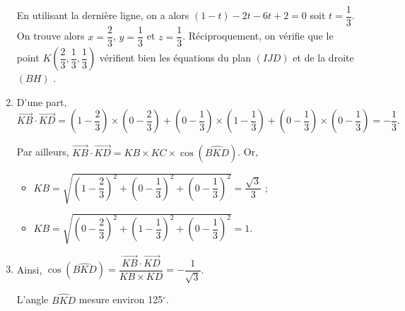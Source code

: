 \documentclass[11pt,fleqn, openany]{book} %
\begin{document}
\begin{solution}
\begin{enumerate}
    En utilisant la dernière ligne, on a alors $(1-t)-2t-6t+2=0$ soit $t=\dfrac{1}{3}$. On trouve alors $x=\dfrac{2}{3}$, $y=\dfrac{1}{3}$ et $z=\dfrac{1}{3}$. Réciproquement, on vérifie que le point $K\left(\dfrac{2}{3},\dfrac{1}{3},\dfrac{1}{3}\right)$ vérifient bien les équations du plan $(IJD)$ et de la droite $(BH)$  .
    
    \item  D'une part, 
    \[\overrightarrow{KB}\cdot \overrightarrow{KD} = \left(1-\dfrac{2}{3}\right) \times \left(0-\dfrac{2}{3}\right)+\left(0-\dfrac{1}{3}\right) \times \left(1-\dfrac{1}{3}\right)+\left(0-\dfrac{1}{3}\right)\times \left(0-\dfrac{1}{3}\right)=-\dfrac{1}{3}.\]
    
    Par ailleurs, $\overrightarrow{KB}\cdot \overrightarrow{KD}=KB \times KC \times \cos (\widehat{BKD})$. Or,
    
    \begin{itemize}
    \item $KB = \sqrt{\left(1-\dfrac{2}{3}\right)^2+\left(0-\dfrac{1}{3}\right)^2+\left(0-\dfrac{1}{3}\right)^2}=\dfrac{\sqrt{3}}{3}$ ;
    \item  $KB = \sqrt{\left(0-\dfrac{2}{3}\right)^2+\left(1-\dfrac{1}{3}\right)^2+\left(0-\dfrac{1}{3}\right)^2}=1$.
    \end{itemize}
    
    \item   Ainsi, $ \cos (\widehat{BKD}) = \dfrac{\overrightarrow{KB}\cdot \overrightarrow{KD}}{KB \times KD}=-\dfrac{1}{\sqrt{3}}$.
    
    L'angle $\widehat{BKD}$ mesure environ 125$^{\circ}$.\end{enumerate}
    \end{solution}    
\end{document}
